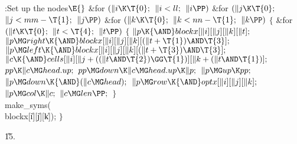 \B{}:Set up the  nodes\X${}\E{}$\6
\&{for} ${}(\|i\K\T{0};{}$ ${}\|i<\\{ll};{}$ ${}\|i\PP){}$\1\6
\&{for} ${}(\|j\K\T{0};{}$ ${}\|j<\\{mm}-\T{1};{}$ ${}\|j\PP){}$\1\6
\&{for} ${}(\|k\K\T{0};{}$ ${}\|k<\\{nn}-\T{1};{}$ ${}\|k\PP){}$\5
${}\{{}$\1\6
\&{for} ${}(\|t\K\T{0};{}$ ${}\|t<\T{4};{}$ ${}\|t\PP){}$\5
${}\{{}$\1\6
${}\|p\K{\AND}\\{blockx}[\|i][\|j][\|k][\|t];{}$\6
${}\|p\MG\\{right}\K{\AND}\\{blockx}[\|i][\|j][\|k][(\|t+\T{1})\AND\T{3}];{}$\6
${}\|p\MG\\{left}\K{\AND}\\{blockx}[\|i][\|j][\|k][(\|t+\T{3})\AND\T{3}];{}$\6
${}\|c\K{\AND}\\{cells}[\|i][\|j+((\|t\AND\T{2})\GG\T{1})][\|k+(\|t\AND%
\T{1})];{}$\6
${}\\{pp}\K\|c\MG\\{head}.\\{up};{}$\6
${}\\{pp}\MG\\{down}\K\|c\MG\\{head}.\\{up}\K\|p;{}$\6
${}\|p\MG\\{up}\K\\{pp};{}$\6
${}\|p\MG\\{down}\K{\AND}(\|c\MG\\{head});{}$\6
${}\|p\MG\\{row}\K{\AND}\\{optx}[\|i][\|j][\|k];{}$\6
${}\|p\MG\\{col}\K\|c;{}$\6
${}\|c\MG\\{len}\PP;{}$\6
\4${}\}{}$\2\6
\\{make\_syms}(\\{blockx}[\|i][\|j][\|k]);\6
\4${}\}{}$\2\2\2\par
\U15.\fi

